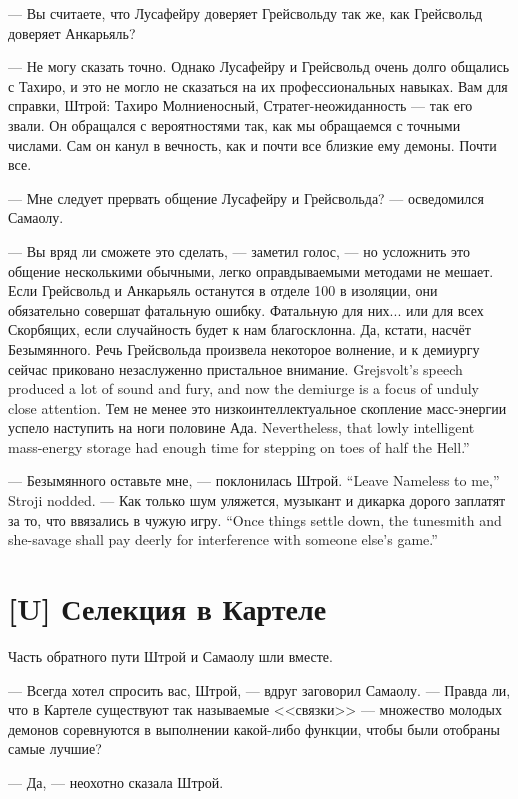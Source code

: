 --- Вы считаете, что Лусафейру доверяет Грейсвольду так же, как Грейсвольд доверяет Анкарьяль?

--- Не могу сказать точно.
Однако Лусафейру и Грейсвольд очень долго общались с Тахиро, и это не могло не сказаться на их профессиональных навыках.
Вам для справки, Штрой: Тахиро Молниеносный, Стратег-неожиданность --- так его звали.
Он обращался с вероятностями так, как мы обращаемся с точными числами.
Сам он канул в вечность, как и почти все близкие ему демоны.
Почти все.

--- Мне следует прервать общение Лусафейру и Грейсвольда? --- осведомился Самаолу.

--- Вы вряд ли сможете это сделать, --- заметил голос, --- но усложнить это общение несколькими обычными, легко оправдываемыми методами не мешает.
Если Грейсвольд и Анкарьяль останутся в отделе 100 в изоляции, они обязательно совершат фатальную ошибку.
Фатальную для них... или для всех Скорбящих, если случайность будет к нам благосклонна.
Да, кстати, насчёт Безымянного.
{Речь Грейсвольда произвела некоторое волнение, и к демиургу сейчас приковано незаслуженно пристальное внимание.}
{Grejsvolt's speech produced a lot of sound and fury, and now the demiurge is a focus of unduly close attention.}
{Тем не менее это низкоинтеллектуальное скопление масс-энергии успело наступить на ноги половине Ада.}
{Nevertheless, that lowly intelligent mass-energy storage had enough time for stepping on toes of half the Hell.''}

{--- Безымянного оставьте мне, --- поклонилась Штрой.}
{``Leave Nameless to me,'' Stroji nodded.}
{--- Как только шум уляжется, музыкант и дикарка дорого заплатят за то, что ввязались в чужую игру.}
{``Once things settle down, the tunesmith and she-savage shall pay deerly for interference with someone else's game.''}

\section{[U] Селекция в Картеле}

Часть обратного пути Штрой и Самаолу шли вместе.

--- Всегда хотел спросить вас, Штрой, --- вдруг заговорил Самаолу.
--- Правда ли, что в Картеле существуют так называемые <<связки>> --- множество молодых демонов соревнуются в выполнении какой-либо функции, чтобы были отобраны самые лучшие?

--- Да, --- неохотно сказала Штрой.

